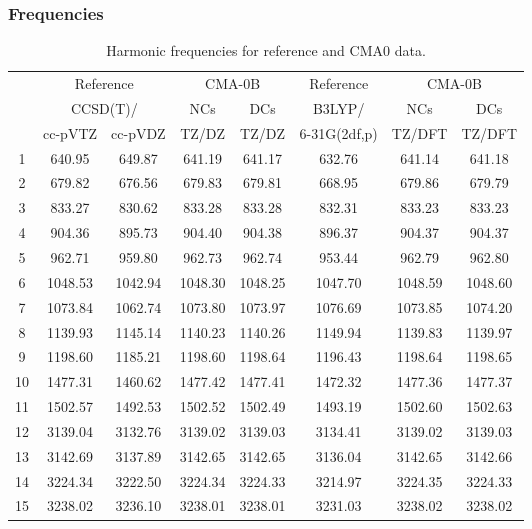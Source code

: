 \documentclass[10pt,oneside]{article}
\begin{document}
\subsubsection*{Frequencies}
\begin{table}[h!]
\centering
\caption{Harmonic frequencies for reference and CMA0 data.}
\begin{tabular}{cccccccc}
\toprule
{} & \multicolumn{2}{c}{Reference} & \multicolumn{2}{c}{CMA-0B} &    Reference & \multicolumn{2}{c}{CMA-0B} \\
{} & \multicolumn{2}{c}{CCSD(T)/} &     NCs &     DCs &       B3LYP/ &     NCs &     DCs \\
{} &   cc-pVTZ & cc-pVDZ &   TZ/DZ &   TZ/DZ & 6-31G(2df,p) &  TZ/DFT &  TZ/DFT \\
\midrule
1  &    640.95 &  649.87 &  641.19 &  641.17 &       632.76 &  641.14 &  641.18 \\
2  &    679.82 &  676.56 &  679.83 &  679.81 &       668.95 &  679.86 &  679.79 \\
3  &    833.27 &  830.62 &  833.28 &  833.28 &       832.31 &  833.23 &  833.23 \\
4  &    904.36 &  895.73 &  904.40 &  904.38 &       896.37 &  904.37 &  904.37 \\
5  &    962.71 &  959.80 &  962.73 &  962.74 &       953.44 &  962.79 &  962.80 \\
6  &   1048.53 & 1042.94 & 1048.30 & 1048.25 &      1047.70 & 1048.59 & 1048.60 \\
7  &   1073.84 & 1062.74 & 1073.80 & 1073.97 &      1076.69 & 1073.85 & 1074.20 \\
8  &   1139.93 & 1145.14 & 1140.23 & 1140.26 &      1149.94 & 1139.83 & 1139.97 \\
9  &   1198.60 & 1185.21 & 1198.60 & 1198.64 &      1196.43 & 1198.64 & 1198.65 \\
10 &   1477.31 & 1460.62 & 1477.42 & 1477.41 &      1472.32 & 1477.36 & 1477.37 \\
11 &   1502.57 & 1492.53 & 1502.52 & 1502.49 &      1493.19 & 1502.60 & 1502.63 \\
12 &   3139.04 & 3132.76 & 3139.02 & 3139.03 &      3134.41 & 3139.02 & 3139.03 \\
13 &   3142.69 & 3137.89 & 3142.65 & 3142.65 &      3136.04 & 3142.65 & 3142.66 \\
14 &   3224.34 & 3222.50 & 3224.34 & 3224.33 &      3214.97 & 3224.35 & 3224.33 \\
15 &   3238.02 & 3236.10 & 3238.01 & 3238.01 &      3231.03 & 3238.02 & 3238.02 \\
\bottomrule
\end{tabular}
\end{table}
\end{document}
